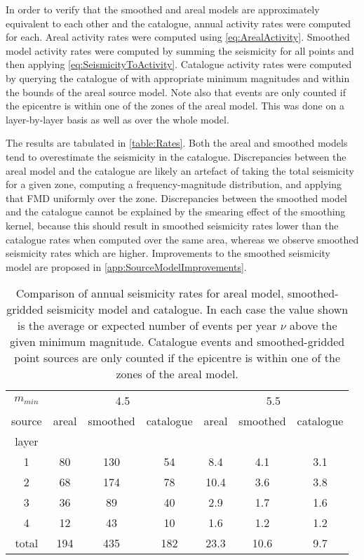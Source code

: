 \documentclass{article}
\begin{document}
In order to verify that the smoothed and areal models are approximately equivalent to each other and the catalogue, annual activity rates were computed for each.
Areal activity rates were computed using \eqref{eq:ArealActivity}.
Smoothed model activity rates were computed by summing the seismicity for all points and then applying \eqref{eq:SeismicityToActivity}.
Catalogue activity rates were computed by querying the catalogue of \cite{nath2010earthquake} with appropriate minimum magnitudes and within the bounds of the areal source model.
Note also that events are only counted if the epicentre is within one of the zones of the areal model.
This was done on a layer-by-layer basis as well as over the whole model.

The results are tabulated in \autoref{table:Rates}.
Both the areal and smoothed models tend to overestimate the seismicity in the catalogue.
Discrepancies between the areal model and the catalogue are likely an artefact of taking the total seismicity for a given zone, computing a frequency-magnitude distribution, and applying that FMD uniformly over the zone.
Discrepancies between the smoothed model and the catalogue cannot be explained by the smearing effect of the smoothing kernel, because this should result in smoothed seismicity rates lower than the catalogue rates when computed over the same area, whereas we observe smoothed seismicity rates which are higher.
Improvements to the smoothed seismicity model are proposed in \autoref{app:SourceModelImprovements}.

\begin{table}
\caption[Comparison of annual seismicity rates]{Comparison of annual seismicity rates for areal model, smoothed-gridded seismicity model and catalogue.
In each case the value shown is the average or expected number of events per year $\nu$ above the given minimum magnitude.
Catalogue events and smoothed-gridded point sources are only counted if the epicentre is within one of the zones of the areal model.}
\label{table:Rates}
\centering
\begin{tabular}{ccccccc}
\toprule
$m_{min}$ & \multicolumn{3}{c}{4.5} & \multicolumn{3}{c}{5.5} \\
source &  areal & smoothed & catalogue & areal & smoothed & catalogue \\
\midrule
layer   &      &        &         &       &          &           \\
1       &   80 &    130 &      54 &   8.4 &      4.1 &       3.1 \\
2       &   68 &    174 &      78 &  10.4 &      3.6 &       3.8 \\
3       &   36 &     89 &      40 &   2.9 &      1.7 &       1.6 \\
4       &   12 &     43 &      10 &   1.6 &      1.2 &       1.2 \\
total   &  194 &    435 &     182 &  23.3 &     10.6 &       9.7 \\
\bottomrule
\end{tabular}
\end{table}
\end{document}
